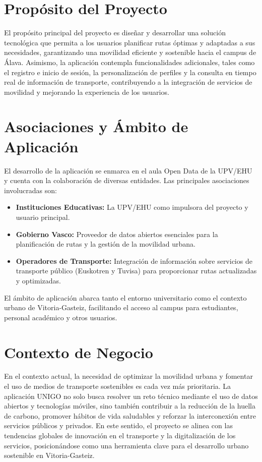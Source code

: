 \documentclass[a4paper,12pt]{report}
\begin{document}
    \section{Propósito del Proyecto}
      El propósito principal del proyecto es diseñar y desarrollar una solución tecnológica que permita a los usuarios planificar rutas óptimas y adaptadas a sus necesidades, garantizando una movilidad eficiente y sostenible hacia el campus de Álava. Asimismo, la aplicación contempla funcionalidades adicionales, tales como el registro e inicio de sesión, la personalización de perfiles y la consulta en tiempo real de información de transporte, contribuyendo a la integración de servicios de movilidad y mejorando la experiencia de los usuarios.
    \section{Asociaciones y Ámbito de Aplicación}
      El desarrollo de la aplicación se enmarca en el aula Open Data de la UPV/EHU y cuenta con la colaboración de diversas entidades. Las principales asociaciones involucradas son:
      \begin{itemize}
        \item \textbf{Instituciones Educativas:} La UPV/EHU como impulsora del proyecto y usuario principal.
        \item \textbf{Gobierno Vasco:} Proveedor de datos abiertos esenciales para la planificación de rutas y la gestión de la movilidad urbana.
        \item \textbf{Operadores de Transporte:} Integración de información sobre servicios de transporte público (Euskotren y Tuvisa) para proporcionar rutas actualizadas y optimizadas.
      \end{itemize}
      El ámbito de aplicación abarca tanto el entorno universitario como el contexto urbano de Vitoria-Gasteiz, facilitando el acceso al campus para estudiantes, personal académico y otros usuarios.
    \section{Contexto de Negocio}
      En el contexto actual, la necesidad de optimizar la movilidad urbana y fomentar el uso de medios de transporte sostenibles es cada vez más prioritaria. La aplicación UNIGO no solo busca resolver un reto técnico mediante el uso de datos abiertos y tecnologías móviles, sino también contribuir a la reducción de la huella de carbono, promover hábitos de vida saludables y reforzar la interconexión entre servicios públicos y privados. En este sentido, el proyecto se alinea con las tendencias globales de innovación en el transporte y la digitalización de los servicios, posicionándose como una herramienta clave para el desarrollo urbano sostenible en Vitoria-Gasteiz.
\end{document}
